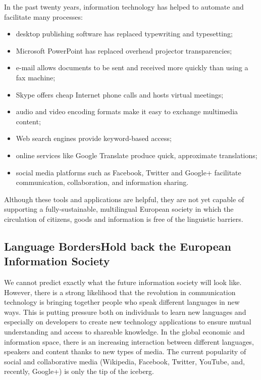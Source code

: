 \documentclass[]{../metanetpaper}
\begin{document}
\begin{multicols}{2}
In the past twenty years, information technology has helped to automate and facilitate many processes:

\begin{itemize}
\item desktop publishing software has replaced typewriting and typesetting;
\item Microsoft PowerPoint has replaced overhead projector transparencies;
\item e-mail allows documents to be sent and received more quickly than using a fax machine;
\item Skype offers cheap Internet phone calls and hosts virtual meetings;
\item audio and video encoding formats make it easy to exchange multimedia content;
\item Web search engines provide keyword-based access;
\item online services like Google Translate produce quick, approximate translations;
\item social media platforms such as Facebook, Twitter and Google+ facilitate communication, collaboration, and information sharing.
\end{itemize}

Although these tools and applications are helpful, they are not yet capable of supporting a fully-sustainable, multilingual European society in which the circulation of citizens, goods and information is free of the linguistic barriers.

\subsection[Language Borders Hold back the European Information Society]{Language Borders\newline Hold back the European Information Society}

We cannot predict exactly what the future information society will look like. However, there is a strong likelihood that the revolution in communication technology is bringing together people who speak different languages in new ways. This is putting pressure both on individuals to learn new languages and especially on developers to create new technology applications to ensure mutual understanding and access to shareable knowledge. In the global economic and information space, there is an increasing interaction between different languages, speakers and content thanks to new types of media. The current popularity of social and collaborative media (Wikipedia, Facebook, Twitter, YouTube, and, recently, Google+) is only the tip of the iceberg.


\end{multicols}
\end{document}
